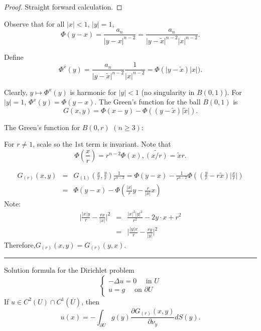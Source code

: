 \documentclass[11pt]{amsart}%
\begin{document}
\begin{proof}
    Straight forward calculation.
\end{proof}

Observe that for all $\vert x\vert <1$, $\vert y\vert =1$,
$$\Phi(y-x)=\frac{a_n}{\vert y-x\vert^{n-2}}=\frac{a_n}{\vert y-\tilde{x}\vert^{n-2}\vert x\vert^{n-2}}.$$

Define $$\Phi^x(y)=\frac{a_n}{\vert y-\tilde{x}\vert^{n-2}}\frac{1}{\vert x\vert^{n-2}}=\Phi(\vert y-\tilde{x})\vert x\vert).$$

Clearly, $y\mapsto \Phi^x(y)$ is harmonic for $\vert y\vert <1$ (no singularity in $B(0,1)$). For $\vert y\vert =1$, $\Phi^x(y)=\Phi(y-x)$. The Green's function for the ball $B(0,1)$ is
$$G(x,y)= \Phi(x-y)-\Phi((y-\tilde{x})\vert \tilde{x}\vert).$$

The Green's function for $B(0,r)$ $(n\ge 3)$:

For $r\not=1$, scale so the 1st term is invariant. Note that
$$\Phi(\frac{x}{r})=r^{n-2}\Phi(x), \widetilde{(x/r)} =\tilde{x}r.$$

\begin{eqnarray*}
    G_{(r)}(x,y)&=& G_{(1)}(\frac{x}{r},\frac{y}{r})\frac{1}{r^{n-2}} = \Phi(y-x)-\frac{1}{r^{n-2}}\Phi((\frac{y}{r}-r\tilde{x})\vert \frac{x}{r}\vert)\\
    &=& \Phi(y-x)-\Phi(\frac{\vert x\vert}{r}y-\frac{r}{\vert x\vert} x)
\end{eqnarray*}
Note: 
\begin{eqnarray*}
    \vert \frac{\vert x\vert y}{r}-\frac{rx}{\vert x\vert}\vert^2 &=&\frac{\vert x\vert^2\vert y\vert^2}{r^2}-2y\cdot x + r^2\\
    &=& \vert \frac{\vert y\vert x}{r}-\frac{ry}{\vert y\vert}\vert^2
\end{eqnarray*}
Therefore,$G_{(r)}(x,y)=G_{(r)}(y,x)$.

\rule{0.5\linewidth}{\linethickness}

Solution formula for the Dirichlet problem
$$\begin{cases}
    -\Delta u =0 \quad \text{ in $U$}\\
    u=g \quad \text{ on $\partial U$}
\end{cases}$$
If $u\in C^2(U)\cap C^1(\overline{U})$, then
$$u(x)=-\int_{\partial U} g(y)\frac{\partial G_{(r)}(x,y)}{\partial \nu_y}dS(y).$$
\end{document}

